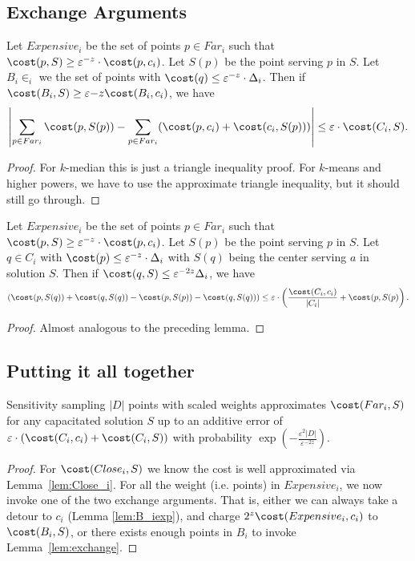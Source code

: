 \subsection{Exchange Arguments}

\begin{lemma}
\label{lem:B_iexp}
Let $Expensive_i$ be the set of points $p\in Far_i$ such that $\cost(p,S) \geq \varepsilon^{-z}\cdot \cost(p,c_i)$. Let $S(p)$ be the point serving $p$ in $S$. 
Let $B_i\in _i$ we the set of points with $\cost(q)\leq \varepsilon^{-z}\cdot \Delta_i$. Then if $\cost(B_i,S) \geq \varepsilon{-z}\cost(B_i,c_i)$, we have 
$$\left\vert\sum_{p\in Far_i} \cost(p,S(p)) -  \sum_{p\in Far_i} (\cost(p,c_i) + \cost(c_i,S(p)))\right\vert \leq \varepsilon\cdot \cost(C_i,S).$$
\end{lemma}
\begin{proof}
For $k$-median this is just a triangle inequality proof. For $k$-means and higher powers, we have to use the approximate triangle inequality, but it should still go through.
\end{proof}

\begin{lemma}
\label{lem:exchange}
Let $Expensive_i$ be the set of points $p\in Far_i$ such that $\cost(p,S) \geq \varepsilon^{-z}\cdot \cost(p,c_i)$. Let $S(p)$ be the point serving $p$ in $S$. 
Let $q\in C_i$ with $\cost(p)\leq \varepsilon^{-z}\cdot \Delta_i$ with $S(q)$ being the center serving $a$ in solution $S$. Then if $\cost(q,S) \leq \varepsilon^{-2z}\Delta_i$, we have 
$$\left(\cost(p,S(q)) + \cost(q,S(q)) - \cost(p,S(p)) - \cost(q,S(q))\right) \leq \varepsilon\cdot \left(\frac{\cost(C_i,c_i)}{|C_i|} + \cost(p,S(p)\right).$$
\end{lemma}
\begin{proof}
Almost analogous to the preceding lemma. 
\end{proof}

\subsection{Putting it all together}

\begin{lemma}
Sensitivity sampling $|D|$ points with scaled weights approximates $\cost(Far_i,S)$ for any capacitated solution $S$ up to an additive error of $\varepsilon\cdot \left(\cost(C_i,c_i) + \cost(C_i,S)\right)$ with probability 
$\exp\left(-\frac{\varepsilon^2 |D|}{\varepsilon^{-2z}}\right)$.
\end{lemma}
\begin{proof}
For $\cost(Close_i,S)$ we know the cost is well approximated via Lemma~\ref{lem:Close_i}. For all the weight (i.e. points) in $Expensive_i$, we now invoke one of the two exchange arguments. That is, either we can always take a detour to $c_i$ (Lemma \ref{lem:B_iexp}), and charge $2^z\cost(Expensive_i,c_i)$ to $\cost(B_i,S)$, or there exists enough points in $B_i$ to invoke Lemma~\ref{lem:exchange}.
\end{proof}

